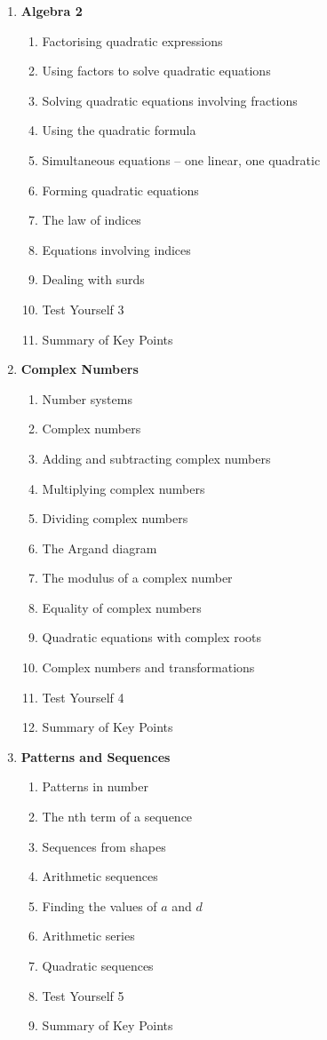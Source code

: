 \documentclass{article}
\begin{document}
\begin{enumerate}
    \item \textbf{Algebra 2}
    \begin{enumerate}
        \item Factorising quadratic expressions
        \item Using factors to solve quadratic equations
        \item Solving quadratic equations involving fractions
        \item Using the quadratic formula
        \item Simultaneous equations – one linear, one quadratic
        \item Forming quadratic equations
        \item The law of indices
        \item Equations involving indices
        \item Dealing with surds
        \item Test Yourself 3
        \item Summary of Key Points
    \end{enumerate}

    \item \textbf{Complex Numbers}
    \begin{enumerate}
        \item Number systems
        \item Complex numbers
        \item Adding and subtracting complex numbers
        \item Multiplying complex numbers
        \item Dividing complex numbers
        \item The Argand diagram
        \item The modulus of a complex number
        \item Equality of complex numbers
        \item Quadratic equations with complex roots
        \item Complex numbers and transformations
        \item Test Yourself 4
        \item Summary of Key Points
    \end{enumerate}

    \item \textbf{Patterns and Sequences}
    \begin{enumerate}
        \item Patterns in number
        \item The nth term of a sequence
        \item Sequences from shapes
        \item Arithmetic sequences
        \item Finding the values of $a$ and $d$
        \item Arithmetic series
        \item Quadratic sequences
        \item Test Yourself 5
        \item Summary of Key Points
    \end{enumerate}


\end{enumerate}
\end{document}
